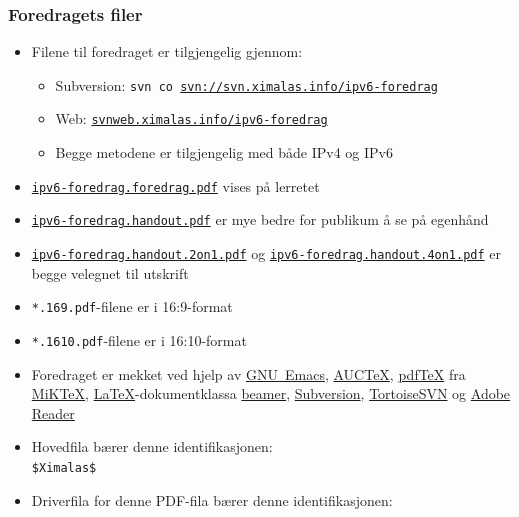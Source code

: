 \begin{frame}[allowframebreaks]
  \frametitle{Foredragets filer}
  \begin{itemize}
  \item Filene til foredraget er tilgjengelig gjennom:
    \begin{itemize}
    \item Subversion: \texttt{svn co
        \url{svn://svn.ximalas.info/ipv6-foredrag}}
    \item Web:
      \href{http://svnweb.ximalas.info/ipv6-foredrag/}{\texttt{svnweb.ximalas.info/ipv6-foredrag}}
    \item Begge metodene er tilgjengelig med både IPv4 og \alert{IPv6}
    \end{itemize}
  \item
    \href{http://svnweb.ximalas.info/ipv6-foredrag/trunk/ipv6-foredrag.foredrag.pdf?view=co}{\texttt{ipv6-foredrag.foredrag.pdf}}
    vises på lerretet
  \item
    \href{http://svnweb.ximalas.info/ipv6-foredrag/trunk/ipv6-foredrag.handout.pdf?view=co}{\texttt{ipv6-foredrag.handout.pdf}}
    er mye bedre for publikum å se på egenhånd
  \item
    \href{http://svnweb.ximalas.info/ipv6-foredrag/trunk/ipv6-foredrag.handout.2on1.pdf?view=co}{\texttt{ipv6-foredrag.handout.2on1.pdf}}
    og
    \href{http://svnweb.ximalas.info/ipv6-foredrag/trunk/ipv6-foredrag.handout.4on1.pdf?view=co}{\texttt{ipv6-foredrag.handout.4on1.pdf}}
    er begge velegnet til utskrift
  \item \texttt{*.169.pdf}-filene er i 16:9-format
  \item \texttt{*.1610.pdf}-filene er i 16:10-format
  \framebreak
  \item Foredraget er mekket ved hjelp av
    \href{http://www.gnu.org/software/emacs/}{GNU~Emacs},
    \href{http://www.gnu.org/software/auctex/}{AUC\TeX},
    \href{http://www.tug.org/applications/pdftex/}{pdf\TeX} fra
    \href{http://miktex.org/}{MiK\TeX},
    \href{http://www.latex-project.org/}{\LaTeX}-dokumentklassa
    \href{https://bitbucket.org/rivanvx/beamer/wiki/Home}{beamer},
    \href{http://subversion.apache.org/}{Subversion},
    \href{http://tortoisesvn.net/}{TortoiseSVN} og
    \href{http://get.adobe.com/no/reader/}{Adobe Reader}
  \item Hovedfila bærer denne identifikasjonen:\\
    \texttt{\$${}$Ximalas${}$\$}
  \item Driverfila for denne PDF-fila bærer denne identifikasjonen:\\

\end{itemize}
\end{frame}
